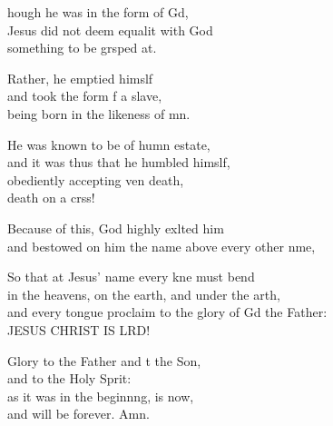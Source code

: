 \settowidth{\versewidth}{and every tongue proclaim to the glory of God the Father: *}
\begin{psalmverse}%
  \begin{patverse}
    hough he was in the form of Gd,\Flex\\
    Jesus did not deem equalit with God\Med\\
    something to be grsped at.
    
    Rather, he emptied himslf\Flex\\
    and took the form f a slave,\Med\\
    being born in the likeness of mn.
    
    He was known to be of humn estate,\Med\\
    and it was thus that he humbled himslf,\\
    obediently accepting ven death,\Med\\
    death on a crss!
    
    Because of this, God highly exlted him\Med\\
    and bestowed on him the name above every other nme,
    
    So that at Jesus’ name every kne must bend\Med\\
    in the heavens, on the earth, and under the arth,\\
    and every tongue proclaim to the glory of Gd the Father:\Med\\
    JESUS CHRIST IS LRD!

    Glory to the Father and t the Son,\Med\\
    and to the Holy Sp\pointup{\i}rit:\\
    as it was in the beginn\pointup{\i}ng, is now,\Med\\
    and will be forever. Amn.
  \end{patverse}
\end{psalmverse}

